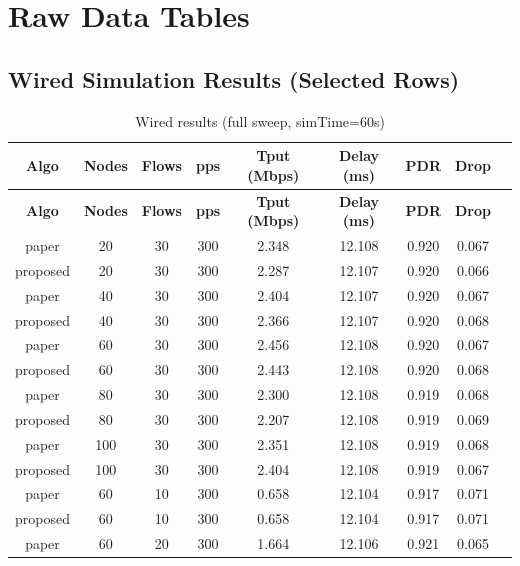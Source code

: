\documentclass[12pt,a4paper]{report}
\begin{document}
\appendix
\chapter{Raw Data Tables}
\label{app:data}

\section{Wired Simulation Results (Selected Rows)}

\begin{longtable}{ccccccccc}
  \caption{Wired results (full sweep, simTime=60s)}\label{tab:wired-full}\\
  \toprule
  \textbf{Algo} & \textbf{Nodes} & \textbf{Flows} & \textbf{pps}
    & \textbf{Tput (Mbps)} & \textbf{Delay (ms)} & \textbf{PDR} & \textbf{Drop} \\
  \midrule
  \endfirsthead
  \toprule
  \textbf{Algo} & \textbf{Nodes} & \textbf{Flows} & \textbf{pps}
    & \textbf{Tput (Mbps)} & \textbf{Delay (ms)} & \textbf{PDR} & \textbf{Drop} \\
  \midrule
  \endhead
  \bottomrule
  \endlastfoot
  paper    & 20 & 30 & 300 & 2.348   & 12.108 & 0.920 & 0.067 \\
  proposed & 20 & 30 & 300 & 2.287   & 12.107 & 0.920 & 0.066 \\
  paper    & 40 & 30 & 300 & 2.404   & 12.107 & 0.920 & 0.067 \\
  proposed & 40 & 30 & 300 & 2.366   & 12.107 & 0.920 & 0.068 \\
  paper    & 60 & 30 & 300 & 2.456   & 12.108 & 0.920 & 0.067 \\
  proposed & 60 & 30 & 300 & 2.443   & 12.108 & 0.920 & 0.068 \\
  paper    & 80 & 30 & 300 & 2.300   & 12.108 & 0.919 & 0.068 \\
  proposed & 80 & 30 & 300 & 2.207   & 12.108 & 0.919 & 0.069 \\
  paper    & 100& 30 & 300 & 2.351   & 12.108 & 0.919 & 0.068 \\
  proposed & 100& 30 & 300 & 2.404   & 12.108 & 0.919 & 0.067 \\
  paper    & 60 & 10 & 300 & 0.658   & 12.104 & 0.917 & 0.071 \\
  proposed & 60 & 10 & 300 & 0.658   & 12.104 & 0.917 & 0.071 \\
  paper    & 60 & 20 & 300 & 1.664   & 12.106 & 0.921 & 0.065 \\

\end{longtable}
\end{document}
